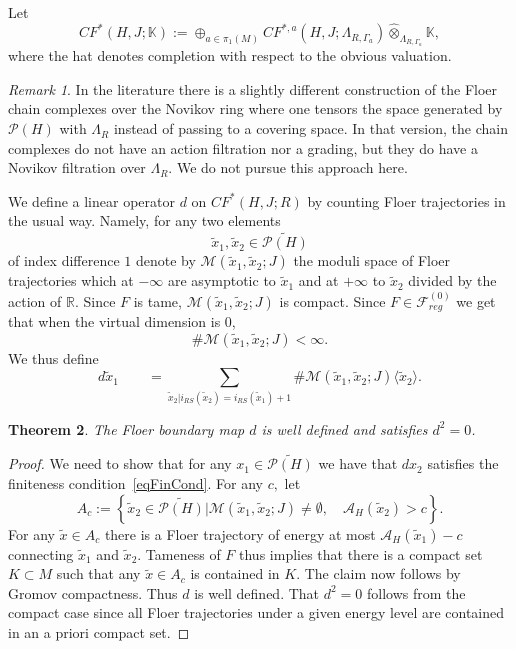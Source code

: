 \documentclass[11pt]{amsart}
\newcommand{\R}{\mathbb{R}}
\newcommand{\K}{\mathbb{K}}
\newtheorem{tm}{Theorem}[section]
\theoremstyle{definition}
\theoremstyle{remark}
\newtheorem{rem}[tm]{Remark}
\begin{document}
Let
\[
CF^*(H,J;\K):=\oplus_{a\in\pi_1(M)} CF^{*,a}(H,J;\Lambda_{R,\Gamma_a})\hat{\otimes}_{\Lambda_{R,\Gamma_a}}\K,
\]
where the hat denotes completion with respect to the obvious valuation. %
 \begin{rem}
 In the literature there is a slightly different construction of the Floer chain complexes over the Novikov ring where one tensors the space generated by $\mathcal{P}(H)$ with $\Lambda_R$ instead of passing to a covering space. In that version, the chain complexes do not have an action filtration nor a grading, but they do have a Novikov filtration over $\Lambda_R$.  We do not pursue this approach here.
\end{rem}
We define a linear operator $d$ on $CF^*(H,J;R)$ by counting Floer trajectories in the usual way. Namely, for any two elements
\[
\tilde{x}_1,\tilde{x}_2\in\widetilde{\mathcal{P}(H)}
\]
of index difference $1$ denote by $\mathcal{M}(\tilde{x}_1,\tilde{x}_2;J)$ the moduli space of Floer trajectories which at $-\infty$ are asymptotic to $\tilde{x}_1$ and at $+\infty$ to $\tilde{x}_2$ divided by the action of $\R$. Since $F$ is tame, $\mathcal{M}(\tilde{x}_1,\tilde{x}_2;J)$ is compact. Since $F\in\mathcal{F}^{(0)}_{reg}$ we get that when the virtual dimension is $0$,
\[
\#\mathcal{M}(\tilde{x}_1,\tilde{x}_2;J)<\infty.
\]
We thus define
\[
d\tilde{x}_1\qquad=\sum_{\tilde{x}_2|i_{RS}(\tilde{x}_2)=i_{RS}(\tilde{x}_1)+1}\#\mathcal{M}(\tilde{x}_1,\tilde{x}_2;J)\langle \tilde{x}_2\rangle.
\]


\begin{tm}\label{tmDifWD}
The Floer boundary map $d$ is well defined and satisfies $d^2=0$.
\end{tm}
\begin{proof}
We need to show that for any $x_1\in\widetilde{\mathcal{P}(H)}$ we have that $dx_2$ satisfies the finiteness condition~\eqref{eqFinCond}. For any $c,$ let
\[
A_c:=\left\{\tilde{x}_2\in\widetilde{\mathcal{P}(H)}|\mathcal{M}(\tilde{x}_1,\tilde{x}_2;J)\neq\emptyset,\quad\mathcal{A}_H(\tilde{x}_2)>c\right\}.
\]
For any $\tilde{x}\in A_c$ there is a Floer trajectory of energy at most $\mathcal{A}_H(\tilde{x}_1)-c$ connecting $\tilde{x}_1$ and $\tilde{x}_2$. Tameness of $F$ thus implies that there is a compact set $K\subset M$ such that any $\tilde{x}\in A_c$ is contained in $K$. The claim now follows by Gromov compactness. Thus $d$ is well defined. That $d^2=0$ follows from the compact case since all Floer trajectories under a given energy level are contained in an a priori compact set.
\end{proof}
\end{document}
